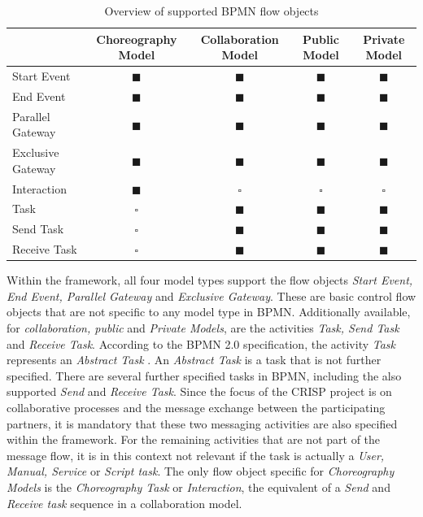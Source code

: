 \begin{table}[H]
\resizebox{\textwidth}{!}
{
\begin{tabular}{l|cccc}
			      & Choreography Model & Collaboration Model & Public Model & Private Model \\ \hline
Start Event       & $\blacksquare$	  & $\blacksquare$      & $\blacksquare$	  & $\blacksquare$  \\
End Event         & $\blacksquare$	  & $\blacksquare$      & $\blacksquare$	  & $\blacksquare$  \\
Parallel Gateway  & $\blacksquare$    & $\blacksquare$      & $\blacksquare$      & $\blacksquare$  \\
Exclusive Gateway & $\blacksquare$    & $\blacksquare$      & $\blacksquare$      & $\blacksquare$  \\
Interaction       & $\blacksquare$    & $\square$           & $\square$           & $\square$       \\
Task          	  & $\square$         & $\blacksquare$      & $\blacksquare$      & $\blacksquare$  \\
Send Task         & $\square$         & $\blacksquare$      & $\blacksquare$      & $\blacksquare$  \\
Receive Task      & $\square$         & $\blacksquare$		& $\blacksquare$      & $\blacksquare$       
\end{tabular}%
}
\caption{Overview of supported BPMN flow objects}
\label{tab:flow_objects}
\end{table}

Within the framework, all four model types support the flow objects \textit{Start Event, End Event, Parallel Gateway} and \textit{Exclusive Gateway}. These are basic control flow objects that are not specific to any model type in BPMN. Additionally available, for \textit{collaboration, public} and \textit{Private Models}, are the activities \textit{Task, Send Task} and \textit{Receive Task}. According to the BPMN 2.0 specification, the activity \textit{Task} represents an \textit{Abstract Task} \cite{BPMN20}. An \textit{Abstract Task} is a task that is not further specified. There are several further specified tasks in BPMN, including the also supported \textit{Send} and \textit{Receive Task}. Since the focus of the CRISP project is on collaborative processes and the message exchange between the participating partners, it is mandatory that these two messaging activities are also specified within the framework. For the remaining activities that are not part of the message flow, it is in this context not relevant if the task is actually a \textit{User, Manual, Service} or \textit{Script task}. The only flow object specific for \textit{Choreography Models} is the \textit{Choreography Task} or \textit{Interaction}, the equivalent of a \textit{Send} and \textit{Receive task} sequence in a collaboration model.   

